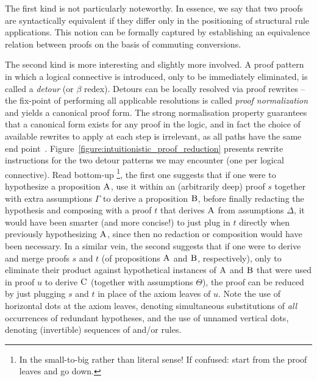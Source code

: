 The first kind is not particularly noteworthy.
In essence, we say that two proofs are syntactically equivalent if they differ only in the positioning of structural rule applications.
This notion can be formally captured by establishing an equivalence relation between proofs on the basis of commuting conversions.

The second kind is more interesting and slightly more involved.
A proof pattern in which a logical connective is introduced, only to be immediately eliminated, is called a \textit{detour} (or $\beta$ redex).
Detours can be locally resolved via proof rewrites -- the fix-point of performing all applicable resolutions is called \textit{proof normalization} and yields a canonical proof form. 
The strong normalisation property guarantees that a canonical form exists for any proof in the logic, and in fact the choice of available rewrites to apply at each step is irrelevant, as all paths have the same end point~\cite{groote1999strong}.
Figure~\ref{figure:intuitionistic_proof_reduction} presents rewrite instructions for the two detour patterns we may encounter (one per logical connective).
Read bottom-up%
\footnote{In the small-to-big rather than literal sense! If confused: start from the proof leaves and go down.},
the first one suggests that if one were to hypothesize a proposition $\normalfont\textsc{A}$, use it within an (arbitrarily deep) proof $s$ together with extra assumptions $\Gamma$ to derive a proposition $\normalfont\textsc{B}$, before finally redacting the hypothesis and composing with a proof $t$ that derives $\normalfont\textsc{A}$ from assumptions $\Delta$, it would have been smarter (and more concise!) to just plug in $t$ directly when previously hypothesizing $\normalfont\textsc{A}$, since then no redaction or composition would have been necessary.
In a similar vein, the second suggests that if one were to derive and merge proofs $s$ and $t$ (of propositions $\normalfont\textsc{A}$ and $\normalfont\textsc{B}$, respectively), only to eliminate their product against hypothetical instances of $\normalfont\textsc{A}$ and $\normalfont\textsc{B}$ that were used in proof $u$ to derive $\normalfont\textsc{C}$ (together with assumptions $\Theta$), the proof can be reduced by just plugging $s$ and $t$ in place of the axiom leaves of $u$.
Note the use of horizontal dots at the axiom leaves, denoting simultaneous substitutions of \textit{all} occurrences of redundant hypotheses, and the use of unnamed vertical dots, denoting (invertible) sequences of \Contraction{} and/or \Exchange{} rules.

